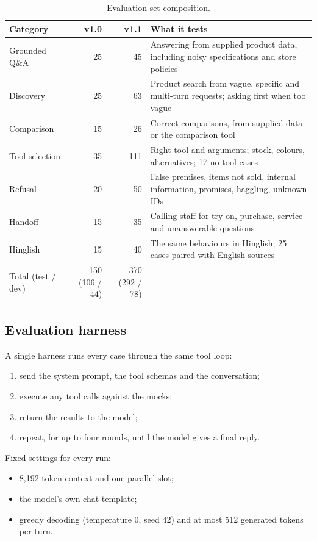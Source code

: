 \documentclass[11pt,a4paper]{article}
\begin{document}
\begin{table}[H]
\centering
\small
\begin{tabularx}{\textwidth}{l r r L}
\toprule
Category & v1.0 & v1.1 & What it tests \\
\midrule
Grounded Q\&A & 25 & 45 & Answering from supplied product data, including noisy specifications and store policies \\
Discovery & 25 & 63 & Product search from vague, specific and multi-turn requests; asking first when too vague \\
Comparison & 15 & 26 & Correct comparisons, from supplied data or the comparison tool \\
Tool selection & 35 & 111 & Right tool and arguments; stock, colours, alternatives; 17 no-tool cases \\
Refusal & 20 & 50 & False premises, items not sold, internal information, promises, haggling, unknown IDs \\
Handoff & 15 & 35 & Calling staff for try-on, purchase, service and unanswerable questions \\
Hinglish & 15 & 40 & The same behaviours in Hinglish; 25 cases paired with English sources \\
\midrule
Total (test / dev) & 150 (106 / 44) & 370 (292 / 78) & \\
\bottomrule
\end{tabularx}
\caption{Evaluation set composition.}
\label{tab:evalset}
\end{table}

\subsection{Evaluation harness}\label{sec:harness}
A single harness runs every case through the same tool loop:
\begin{enumerate}
  \item send the system prompt, the tool schemas and the conversation;
  \item execute any tool calls against the mocks;
  \item return the results to the model;
  \item repeat, for up to four rounds, until the model gives a final reply.
\end{enumerate}

Fixed settings for every run:
\begin{itemize}
  \item 8,192-token context and one parallel slot;
  \item the model's own chat template;
  \item greedy decoding (temperature 0, seed 42) and at most 512 generated tokens per turn.
\end{itemize}
\end{document}
